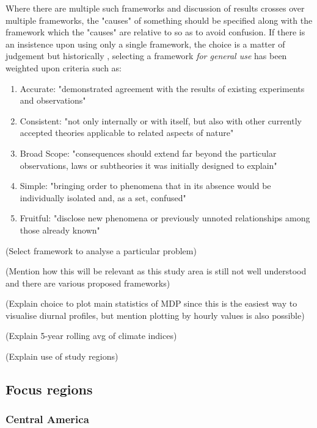Where there are multiple such frameworks and discussion of results crosses over multiple frameworks, the "causes" of something should be specified along with the framework which the "causes" are relative to so as to avoid confusion. If there is an insistence upon using only a single framework, the choice is a matter of judgement but historically \citep{kuhn1970}, selecting a framework \textit{for general use} has been weighted upon criteria such as: 
\begin{enumerate}
	\item Accurate: "demonstrated agreement with the results of existing experiments and observations" \citep{kuhn1977}
	\item Consistent: "not only internally or with itself, but also with other currently accepted theories applicable to related aspects of nature" \citep{kuhn1977}
	\item Broad Scope: "consequences should extend far beyond the particular observations, laws or subtheories it was initially designed to explain" \citep{kuhn1977}
	\item Simple: "bringing order to phenomena that in its absence would be individually isolated and, as a set, confused" \citep{kuhn1977}
	\item Fruitful: "disclose new phenomena or previously unnoted relationships among those already known" \citep{kuhn1977}
\end{enumerate}



(Select framework to analyse a particular problem)

(Mention how this will be relevant as this study area is still not well understood and there are various proposed frameworks)

(Explain choice to plot main statistics of MDP since this is the easiest way to visualise diurnal profiles, but mention plotting by hourly values is also possible)

(Explain 5-year rolling avg of climate indices)

(Explain use of study regions)

\subsection{Focus regions}

\subsubsection{Central America}

